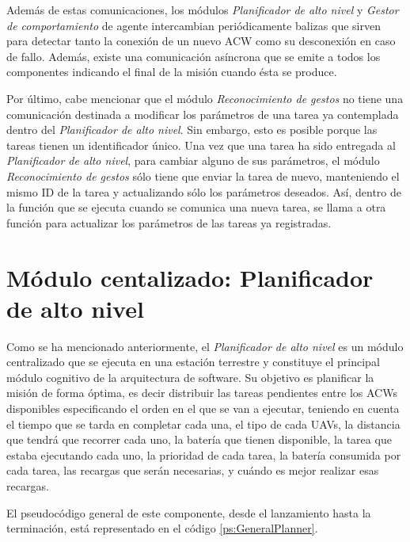 \documentclass[fontsize=11pt, English=false, Español=true, Myfinal=true, twoside, numbers=noenddot]{scrbook}
\begin{document}
{Además de estas comunicaciones, los módulos \emph{Planificador de alto nivel} y \emph{Gestor de comportamiento} de agente intercambian periódicamente balizas que sirven para detectar tanto la conexión de un nuevo \gls{ACW} como su desconexión en caso de fallo. Además, existe una comunicación asíncrona que se emite a todos los componentes indicando el final de la misión cuando ésta se produce.

Por último, cabe mencionar que el módulo \emph{Reconocimiento de gestos} no tiene una comunicación destinada a modificar los parámetros de una tarea ya contemplada dentro del \emph{Planificador de alto nivel}. Sin embargo, esto es posible porque las tareas tienen un identificador único. Una vez que una tarea ha sido entregada al \emph{Planificador de alto nivel}, para cambiar alguno de sus parámetros, el módulo \emph{Reconocimiento de gestos} sólo tiene que enviar la tarea de nuevo, manteniendo el mismo \gls{ID} de la tarea y actualizando sólo los parámetros deseados. Así, dentro de la función que se ejecuta cuando se comunica una nueva tarea, se llama a otra función para actualizar los parámetros de las tareas ya registradas.

\section{Módulo centalizado: Planificador de alto nivel}
\label{sec:Centralised module:TaskPlanner}
Como se ha mencionado anteriormente, el \emph{Planificador de alto nivel} es un módulo centralizado que se ejecuta en una estación terrestre y constituye el principal módulo cognitivo de la arquitectura de software. Su objetivo es planificar la misión de forma óptima, es decir distribuir las tareas pendientes entre los \glspl{ACW} disponibles especificando el orden en el que se van a ejecutar, teniendo en cuenta el tiempo que se tarda en completar cada una, el tipo de cada \glspl{UAV}, la distancia que tendrá que recorrer cada uno, la batería que tienen disponible, la tarea que estaba ejecutando cada uno, la prioridad de cada tarea, la batería consumida por cada tarea, las recargas que serán necesarias, y cuándo es mejor realizar esas recargas.

El pseudocódigo general de este componente, desde el lanzamiento hasta la terminación, está representado en el código \ref{ps:GeneralPlanner}.

}
\end{document}
